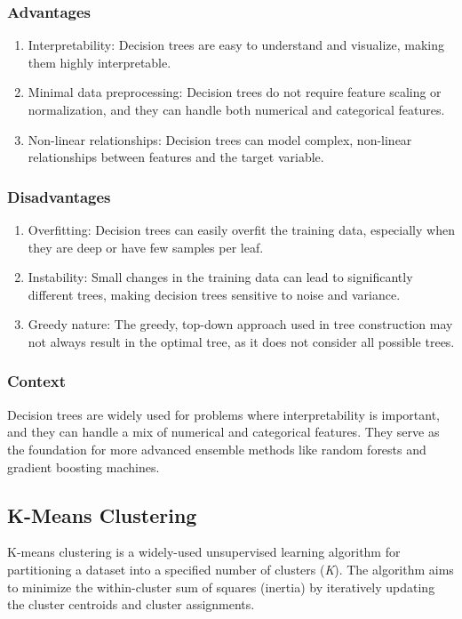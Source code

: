 \documentclass[12pt]{article}
\begin{document}
\subsubsection{Advantages}
\begin{enumerate}
\item Interpretability: Decision trees are easy to understand and visualize, making them highly interpretable.
\item Minimal data preprocessing: Decision trees do not require feature scaling or normalization, and they can handle both numerical and categorical features.
\item Non-linear relationships: Decision trees can model complex, non-linear relationships between features and the target variable.
\end{enumerate}

\subsubsection{Disadvantages}
\begin{enumerate}
\item Overfitting: Decision trees can easily overfit the training data, especially when they are deep or have few samples per leaf.
\item Instability: Small changes in the training data can lead to significantly different trees, making decision trees sensitive to noise and variance.
\item Greedy nature: The greedy, top-down approach used in tree construction may not always result in the optimal tree, as it does not consider all possible trees.
\end{enumerate}

\subsubsection{Context}

Decision trees are widely used for problems where interpretability is important, and they can handle a mix of numerical and categorical features. They serve as the foundation for more advanced ensemble methods like random forests and gradient boosting machines.


\subsection{K-Means Clustering}
K-means clustering is a widely-used unsupervised learning algorithm for partitioning a dataset into a specified number of clusters (\textit{K}). The algorithm aims to minimize the within-cluster sum of squares (inertia) by iteratively updating the cluster centroids and cluster assignments.
\end{document}
